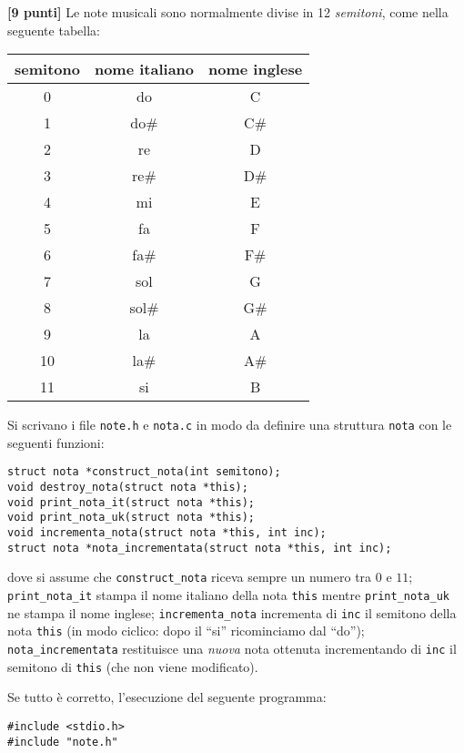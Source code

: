 \documentclass{article}[10pt]
\newcounter{esnu}
\newenvironment{esercizio}{\medskip \noindent {\bf Esercizio\addtocounter{esnu}{1} \arabic{esnu}}}{}
\begin{document}
\newpage
\begin{esercizio}
\textbf{[9 punti]}
%
Le note musicali sono normalmente divise in 12 \emph{semitoni}, come nella seguente tabella:

\begin{center}
\begin{tabular}{c|c|c}
  semitono & nome italiano & nome inglese \\\hline
  0 & do & C \\
  1 & do\# & C\#\\
  2 & re & D\\
  3 & re\# & D\#\\
  4 & mi & E \\
  5 & fa & F \\
  6 & fa\# & F\# \\
  7 & sol & G \\
  8 & sol\# & G\# \\
  9 & la & A \\
  10 & la\# & A\# \\
  11 & si & B
\end{tabular}
\end{center}

\noindent
Si scrivano i file \texttt{note.h} e \texttt{nota.c} in modo da definire una struttura \texttt{nota} con le
seguenti funzioni:
%
{\small
\begin{verbatim}
struct nota *construct_nota(int semitono);
void destroy_nota(struct nota *this);
void print_nota_it(struct nota *this);
void print_nota_uk(struct nota *this);
void incrementa_nota(struct nota *this, int inc);
struct nota *nota_incrementata(struct nota *this, int inc);
\end{verbatim}
}

\noindent
dove si assume che \texttt{construct\_nota} riceva sempre un numero tra $0$ e $11$;
\texttt{print\_nota\_it} stampa il nome italiano della nota \texttt{this} mentre
\texttt{print\_nota\_uk} ne stampa il nome inglese; \texttt{incrementa\_nota} incrementa di
\texttt{inc} il semitono della nota \texttt{this} (in modo ciclico: dopo il ``si'' ricominciamo
dal ``do''); \texttt{nota\_incrementata} restituisce una \emph{nuova} nota ottenuta incrementando
di \texttt{inc} il semitono di \texttt{this} (che non viene modificato).

Se tutto \`e corretto, l'esecuzione del seguente programma:

{\small
\begin{verbatim}
#include <stdio.h>
#include "note.h"


\end{verbatim}}
\end{esercizio}
\end{document}
